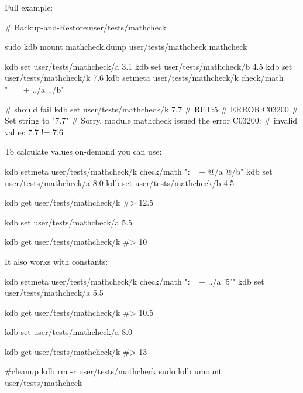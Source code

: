Full example\+:


\begin{DoxyCode}
# Backup-and-Restore:user/tests/mathcheck

sudo kdb mount mathcheck.dump user/tests/mathcheck mathcheck

kdb set user/tests/mathcheck/a 3.1
kdb set user/tests/mathcheck/b 4.5
kdb set user/tests/mathcheck/k 7.6
kdb setmeta user/tests/mathcheck/k check/math "== + ../a ../b"

# should fail
kdb set user/tests/mathcheck/k 7.7
# RET:5
# ERROR:C03200
# Set string to "7.7"
# Sorry, module mathcheck issued the error C03200:
# invalid value: 7.7 != 7.6
\end{DoxyCode}


To calculate values on-\/demand you can use\+:


\begin{DoxyCode}
kdb setmeta user/tests/mathcheck/k check/math ":= + @/a @/b"
kdb set user/tests/mathcheck/a 8.0
kdb set user/tests/mathcheck/b 4.5

kdb get user/tests/mathcheck/k
#> 12.5

kdb set user/tests/mathcheck/a 5.5

kdb get user/tests/mathcheck/k
#> 10
\end{DoxyCode}


It also works with constants\+:


\begin{DoxyCode}
kdb setmeta user/tests/mathcheck/k check/math ":= + ../a '5'"
kdb set user/tests/mathcheck/a 5.5

kdb get user/tests/mathcheck/k
#> 10.5

kdb set user/tests/mathcheck/a 8.0

kdb get user/tests/mathcheck/k
#> 13

#cleanup
kdb rm -r user/tests/mathcheck
sudo kdb umount user/tests/mathcheck
\end{DoxyCode}
 